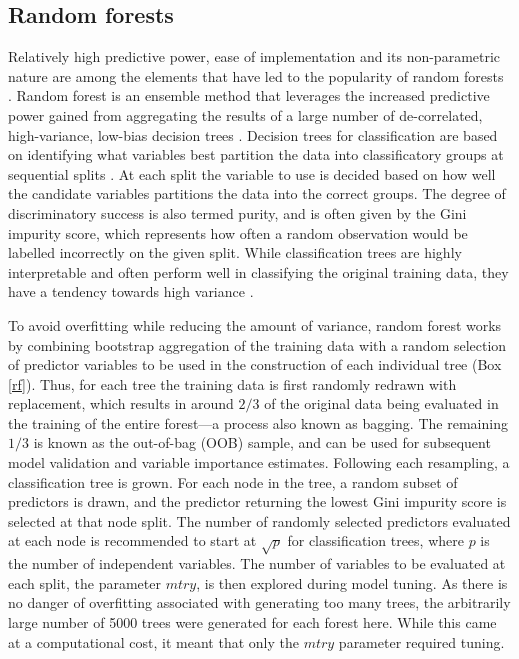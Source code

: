 \documentclass[12pt, a4paper]{article}
\begin{document}
\subsection{Random forests}
Relatively high predictive power, ease of implementation and its non-parametric nature are among the elements that have led to the popularity of random forests \citep[][587--604]{hastie2009}. Random forest is an ensemble method that leverages the increased predictive power gained from aggregating the results of a large number of de-correlated, high-variance, low-bias decision trees \citep{breiman2001b}. Decision trees for classification are based on identifying what variables best partition the data into classificatory groups at sequential splits \citep[][116--118]{baxter2003}. At each split the variable to use is decided based on how well the candidate variables partitions the data into the correct groups. The degree of discriminatory success is also termed purity, and is often given by the Gini impurity score, which represents how often a random observation would be labelled incorrectly on the given split. While classification trees are highly interpretable and often perform well in classifying the original training data, they have a tendency towards high variance \citep[][312]{hastie2009}. \par
To avoid overfitting while reducing the amount of variance, random forest works by combining bootstrap aggregation of the training data with a random selection of predictor variables to be used in the construction of each individual tree (Box \ref{rf}). Thus, for each tree the training data is first randomly redrawn with replacement, which results in around $2/3$ of the original data being evaluated in the training of the entire forest---a process also known as bagging. The remaining $1/3$ is known as the out-of-bag (OOB) sample, and can be used for subsequent model validation and variable importance estimates. Following each resampling, a classification tree is grown. For each node in the tree, a random subset of predictors is drawn, and the predictor returning the lowest Gini impurity score is selected at that node split. The number of randomly selected predictors evaluated at each node is recommended to start at $\sqrt{p}$ for classification trees, where $p$ is the number of independent variables. The number of variables to be evaluated at each split, the parameter $mtry$, is then explored during model tuning. As there is no danger of overfitting associated with generating too many trees, the arbitrarily large number of 5000 trees were generated for each forest here. While this came at a computational cost, it meant that only the $mtry$ parameter required tuning. \\
\end{document}
